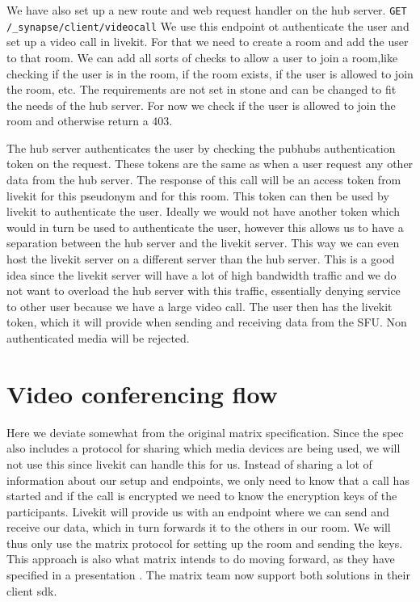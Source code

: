 \documentclass{report}
\begin{document}
We have also set up a new route and web request handler on the hub server.
\texttt{GET /\_synapse/client/videocall} We use this endpoint ot authenticate the user and set up a video call
in livekit. For that we need to create a room and add the user to that room. We can add all sorts of checks to allow
a user to join a room,like checking if the user is in the room, if the room exists, if the user is allowed to
join the room, etc. The requirements are not set in stone and can be changed to fit the needs of the hub server.
For now we check if the user is allowed to join the room and otherwise return a 403.

The hub server authenticates the user by checking the pubhubs authentication token on the request. These tokens are
the same as when a user request any other data from the hub server. The response of this call will be an
access token from livekit for this pseudonym and for this room. This token can then be used by livekit to
authenticate the user. Ideally we would not have another token which would in turn be used to authenticate the
user, however this allows us to have a separation between the hub server and the livekit server. This way we can
even host the livekit server on a different server than the hub server. This is a good idea since the
livekit server will have a lot of high bandwidth traffic and we do not want to overload the hub server with
this traffic, essentially denying service to other user because we have a large video call. The user then
has the livekit token, which it will provide when sending and receiving data from the SFU. Non authenticated
media will be rejected.


\section{Video conferencing flow}
Here we deviate somewhat from the original matrix specification. Since the spec also includes a protocol for
sharing which media devices are being used, we will not use this since livekit can handle this for us. Instead
of sharing a lot of information about our setup and endpoints, we only need to know that a call has started and
if the call is encrypted we need to know the encryption keys of the participants. Livekit will provide us with
an endpoint where we can send and receive our data, which in turn forwards it to the others in our room. We
will thus only use the matrix protocol for setting up the room and sending the keys. This approach is also what
matrix intends to do moving forward, as they have specified in a presentation . The
matrix team now support both solutions in their client sdk.
\end{document}
